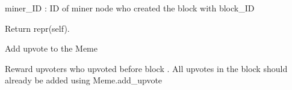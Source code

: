 \documentclass[letterpaper,10pt,english]{sphinxmanual}
\begin{document}
\begin{fulllineitems}
\begin{fulllineitems}
miner\_ID : ID of miner node who created the block with block\_ID

\end{fulllineitems}


\begin{fulllineitems}
\label{\detokenize{index:node_state.Meme.__repr__}}
Return repr(self).

\end{fulllineitems}


\begin{fulllineitems}
\label{\detokenize{index:node_state.Meme.add_upvote}}
Add upvote to the Meme

\end{fulllineitems}


\begin{fulllineitems}
\label{\detokenize{index:node_state.Meme.reward_upvoters}}
Reward upvoters who upvoted before block .  All upvotes
in the block should already be added using Meme.add\_upvote

\end{fulllineitems}


\end{fulllineitems}

\end{document}
